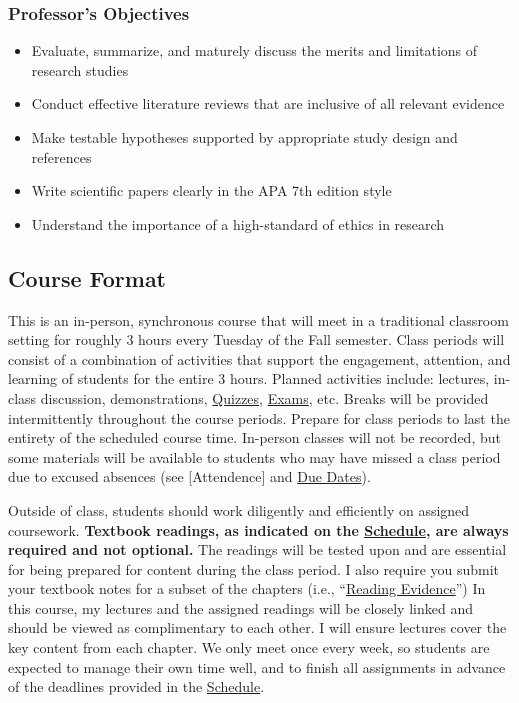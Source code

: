 \documentclass[
  12pt,
  letterpaper,
]{scrartcl}
\providecommand{\tightlist}{%
  \setlength{\itemsep}{0pt}\setlength{\parskip}{0pt}}\usepackage{longtable,booktabs,array}
\begin{document}
\subsubsection{Professor's Objectives}\label{professors-objectives}

\begin{itemize}
\tightlist
\item
  Evaluate, summarize, and maturely discuss the merits and limitations
  of research studies
\item
  Conduct effective literature reviews that are inclusive of all
  relevant evidence
\item
  Make testable hypotheses supported by appropriate study design and
  references
\item
  Write scientific papers clearly in the APA 7th edition style
\item
  Understand the importance of a high-standard of ethics in research
\end{itemize}

\subsection{Course Format}\label{course-format}

This is an in-person, synchronous course that will meet in a traditional
classroom setting for roughly 3 hours every Tuesday of the Fall
semester. Class periods will consist of a combination of activities that
support the engagement, attention, and learning of students for the
entire 3 hours. Planned activities include: lectures, in-class
discussion, demonstrations, \hyperref[quizzes]{Quizzes},
\hyperref[exams]{Exams}, etc. Breaks will be provided intermittently
throughout the course periods. Prepare for class periods to last the
entirety of the scheduled course time. In-person classes will not be
recorded, but some materials will be available to students who may have
missed a class period due to excused absences (see {[}Attendence{]} and
\hyperref[due-dates]{Due Dates}).

Outside of class, students should work diligently and efficiently on
assigned coursework. \textbf{Textbook readings, as indicated on the
\hyperref[schedule]{Schedule}, are always required and not optional.}
The readings will be tested upon and are essential for being prepared
for content during the class period. I also require you submit your
textbook notes for a subset of the chapters (i.e.,
``\hyperref[reading-evidence]{Reading Evidence}'') In this course, my
lectures and the assigned readings will be closely linked and should be
viewed as complimentary to each other. I will ensure lectures cover the
key content from each chapter. We only meet once every week, so students
are expected to manage their own time well, and to finish all
assignments in advance of the deadlines provided in the
\hyperref[schedule]{Schedule}.
\end{document}
